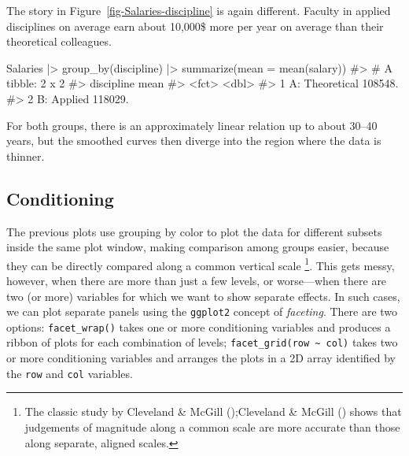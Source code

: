 \documentclass[
  letterpaper,
  10pt,
  krantz2]{krantz}
\makeatletter
\newenvironment{Shaded}{\begin{snugshade}}{\end{snugshade}}
\newcommand{\AttributeTok}[1]{\textcolor[rgb]{0.40,0.45,0.13}{#1}}
\newcommand{\CommentTok}[1]{\textcolor[rgb]{0.37,0.37,0.37}{#1}}
\newcommand{\FunctionTok}[1]{\textcolor[rgb]{0.28,0.35,0.67}{#1}}
\newcommand{\NormalTok}[1]{\textcolor[rgb]{0.00,0.23,0.31}{#1}}
\newcommand{\SpecialCharTok}[1]{\textcolor[rgb]{0.37,0.37,0.37}{#1}}
\newenvironment{kframe}{%
  \medskip{}
  \setlength{\fboxsep}{.8em}
  \def\at@end@of@kframe{}%
  \ifinner\ifhmode%
  \def\at@end@of@kframe{\end{minipage}}%
  \begin{minipage}{\columnwidth}%
  \fi\fi%
  \def\FrameCommand##1{\hskip\@totalleftmargin \hskip-\fboxsep
  \colorbox{shadecolor}{##1}\hskip-\fboxsep
      \hskip-\linewidth \hskip-\@totalleftmargin \hskip\columnwidth}%
  \MakeFramed {\advance\hsize-\width
    \@totalleftmargin\z@ \linewidth\hsize
    \@setminipage}}%
{\par\unskip\endMakeFramed%
  \at@end@of@kframe}
\renewenvironment{Shaded}{\begin{kframe}}{\end{kframe}}
\makeatother
\begin{document}
The story in Figure~\ref{fig-Salaries-discipline} is again different.
Faculty in applied disciplines on average earn about 10,000\$ more per
year on average than their theoretical colleagues.

\begin{Shaded}
\begin{Highlighting}[]
\NormalTok{Salaries }\SpecialCharTok{|\textgreater{}}
  \FunctionTok{group\_by}\NormalTok{(discipline) }\SpecialCharTok{|\textgreater{}}
  \FunctionTok{summarize}\NormalTok{(}\AttributeTok{mean =} \FunctionTok{mean}\NormalTok{(salary)) }
\CommentTok{\#\textgreater{} \# A tibble: 2 x 2}
\CommentTok{\#\textgreater{}   discipline        mean}
\CommentTok{\#\textgreater{}   \textless{}fct\textgreater{}            \textless{}dbl\textgreater{}}
\CommentTok{\#\textgreater{} 1 A: Theoretical 108548.}
\CommentTok{\#\textgreater{} 2 B: Applied     118029.}
\end{Highlighting}
\end{Shaded}

For both groups, there is an approximately linear relation up to about
30--40 years, but the smoothed curves then diverge into the region where
the data is thinner.

\subsection{Conditioning}\label{conditioning}

The previous plots use grouping by color to plot the data for different
subsets inside the same plot window, making comparison among groups
easier, because they can be directly compared along a common vertical
scale \footnote{The classic study by Cleveland \& McGill
  ();Cleveland \& McGill
  () shows that judgements of
  magnitude along a common scale are more accurate than those along
  separate, aligned scales.}. This gets messy, however, when there are
more than just a few levels, or worse---when there are two (or more)
variables for which we want to show separate effects. In such cases, we
can plot separate panels using the \texttt{ggplot2} concept of
\emph{faceting}. There are two options: \texttt{facet\_wrap()} takes one
or more conditioning variables and produces a ribbon of plots for each
combination of levels; \texttt{facet\_grid(row\ \textasciitilde{}\ col)}
takes two or more conditioning variables and arranges the plots in a 2D
array identified by the \texttt{row} and \texttt{col} variables.
\end{document}
